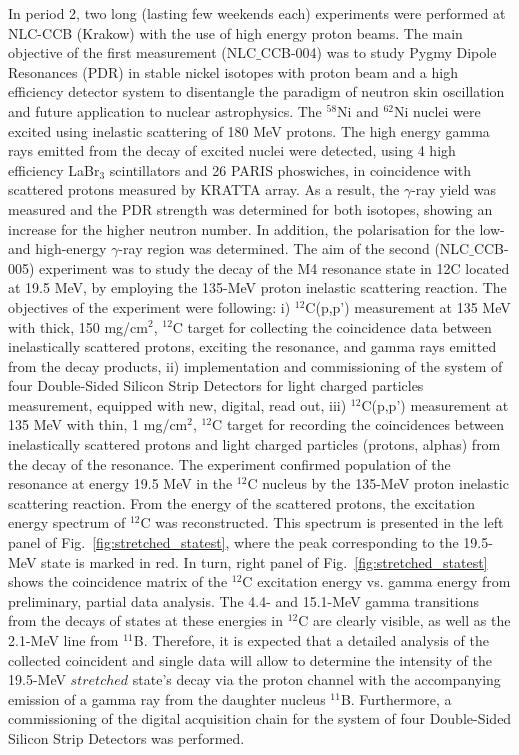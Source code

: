 In period 2, two long (lasting few weekends each) experiments were performed at NLC-CCB (Krakow) with the use of high energy proton beams. 
The main objective of the first measurement (NLC$\_$CCB-004) was to study Pygmy Dipole Resonances (PDR) in stable nickel isotopes with proton beam and a high efficiency detector system to disentangle the paradigm of neutron skin oscillation and future application to nuclear astrophysics. The $^{58}$Ni and $^{62}$Ni nuclei were excited using inelastic scattering of 180 MeV protons. The high energy gamma rays emitted from the decay of excited nuclei were detected, using 4 high efficiency LaBr$_3$ scintillators and 26 PARIS phoswiches, in coincidence with scattered protons measured by KRATTA array. As a result, the $\gamma$-ray yield was measured and the PDR strength was determined for both isotopes, showing an increase for the higher neutron number. In addition, the polarisation for the low- and high-energy $\gamma$-ray region was determined. 
The aim of the second (NLC$\_$CCB-005) experiment was to study the decay of the M4 resonance state in 12C located at 19.5 MeV, by employing the 135-MeV proton inelastic scattering reaction. The objectives of the experiment were following: i) $^{12}$C(p,p') measurement at 135 MeV with thick, 150 mg/cm$^2$, $^{12}$C target for collecting the coincidence data between inelastically scattered protons, exciting the resonance, and gamma rays emitted from the decay products, ii) implementation and commissioning of the system of four Double-Sided Silicon Strip Detectors for light charged particles measurement, equipped with new, digital, read out, iii) $^{12}$C(p,p') measurement at 135 MeV with thin, 1 mg/cm$^2$, $^{12}$C target for recording the coincidences between inelastically scattered protons and light charged particles (protons, alphas) from the decay of the resonance. The experiment confirmed population of the resonance at energy 19.5 MeV in the $^{12}$C nucleus by the 135-MeV proton inelastic scattering reaction. From the energy of the scattered protons, the excitation energy spectrum of $^{12}$C was reconstructed. This spectrum is presented in the left panel of Fig.~\ref{fig:stretched_statest}, where the peak corresponding to the 19.5-MeV state is marked in red. In turn, right panel of Fig.~\ref{fig:stretched_statest} shows the coincidence matrix of the $^{12}$C excitation energy vs. gamma energy from preliminary, partial data analysis. The 4.4- and 15.1-MeV gamma transitions from the decays of states at these energies in $^{12}$C are clearly visible, as well as the 2.1-MeV line from $^{11}$B. Therefore, it is expected that a detailed analysis of the collected coincident and single data will allow to determine the intensity of the 19.5-MeV $stretched$ state's decay via the proton channel with the accompanying emission of a gamma ray from the daughter nucleus $^{11}$B. Furthermore, a commissioning of the digital acquisition chain for the system of four Double-Sided Silicon Strip Detectors was performed. 

